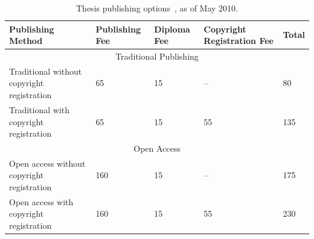 \begin{table}[htbp]
\centering
\caption[Thesis Publishing Options]{Thesis publishing options~\cite{mudd2009}, as of May 2010. }
\label{table:background:publishing}
\begin{tabular}{p{} p{} p{} p{} p{}}
\toprule
\textbf{Publishing Method} & \textbf{Publishing Fee}
 & \textbf{Diploma Fee} & \textbf{Copyright Registration Fee} & \textbf{Total} \\
\midrule
\multicolumn{5}{c}{Traditional Publishing}\\
\midrule

Traditional without copyright registration
& 65 & 15 & -- & 80 \\[0.2em]

Traditional with copyright registration
& 65 & 15 & 55 & 135 \\[0.2em]

\midrule
\multicolumn{5}{c}{Open Access}\\
\midrule

Open access without copyright registration
& 160 & 15 & -- & 175 \\[0.2em]

Open access with copyright registration
& 160 & 15 & 55 & 230 \\

\bottomrule
\end{tabular}
\end{table}